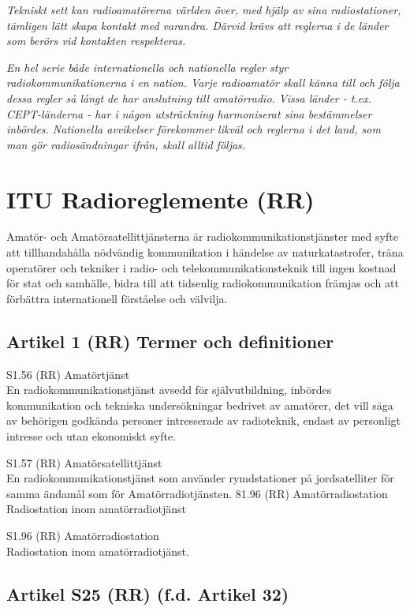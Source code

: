 \emph{Tekniskt sett kan radioamatörerna världen över, med hjälp av
  sina radiostationer, tämligen lätt skapa kontakt med
  varandra. Därvid krävs att reglerna i de länder som berörs vid
  kontakten respekteras.}

\emph{En hel serie både internationella och nationella regler styr
  radiokommunikationerna i en nation. Varje radioamatör skall känna
  till och följa dessa regler så långt de har anslutning till
  amatörradio. Vissa länder - t.ex. CEPT-länderna - har i någon
  utsträckning harmoniserat sina bestämmelser inbördes.  Nationella
  avvikelser förekommer likväl och reglerna i det land, som man gör
  radiosändningar ifrån, skall alltid följas.}

\section{ITU Radioreglemente (RR)}

Amatör- och Amatörsatellittjänsterna är radiokommunikationstjänster
med syfte att tillhandahålla nödvändig kommunikation i händelse av
naturkatastrofer, träna operatörer och tekniker i radio- och
telekommunikationsteknik till ingen kostnad för stat och samhälle,
bidra till att tidsenlig radiokommunikation främjas och att förbättra
internationell förståelse och välvilja.

\subsection{Artikel 1 (RR) Termer och definitioner}

S1.56 (RR) Amatörtjänst \\
En radiokommunikationstjänst avsedd för självutbildning, inbördes
kommunikation och tekniska undersökningar bedrivet av amatörer, det
vill säga av behörigen godkända personer intresserade av radioteknik,
endast av personligt intresse och utan ekonomiskt syfte.

S1.57 (RR) Amatörsatellittjänst \\
En radiokommunikationstjänst som använder rymdstationer på
jordsatelliter för samma ändamål som för Amatörradiotjänsten.  81.96
(RR) Amatörradiostation Radiostation inom amatörradiotjänst

S1.96 (RR) Amatörradiostation \\
Radiostation inom amatörradiotjänst.

\subsection{Artikel S25 (RR) (f.d. Artikel 32)}

